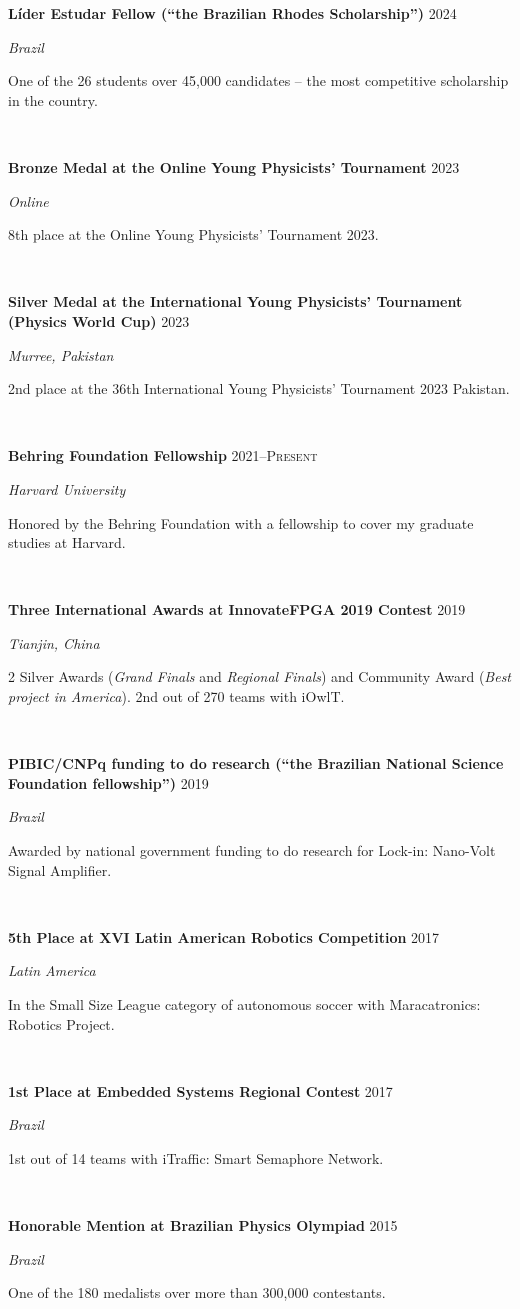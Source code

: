 \documentclass[letterpaper,10pt]{article}
\newcommand{\entry}[4]{

\begin{minipage}[t]{.15\textwidth}
\end{minipage}
\hfill\vline\hfill 
\begin{minipage}[t]{0.95\textwidth}
#2 \hfill \textsc{#1}

\textit{#3}

\footnotesize{#4}
\end{minipage}\\\vspace{.25cm}}
\begin{document}
\entry{2024}{\textbf{Líder Estudar Fellow (``the Brazilian Rhodes Scholarship'')} }{Brazil}{
	One of the 26 students over 45,000 candidates -- the most competitive scholarship in the country.	
}

\entry{2023}{\textbf{Bronze Medal at the Online Young Physicists' Tournament}}{Online}{
	8th place at the Online Young Physicists' Tournament 2023.	
}

\entry{2023}{\textbf{Silver Medal at the International Young Physicists' Tournament (Physics World Cup)}}{Murree, Pakistan}{
	2nd place at the 36th International Young Physicists' Tournament 2023 Pakistan.	
}

\entry{2021--Present}{\textbf{Behring Foundation Fellowship}}{Harvard University}{
	Honored by the Behring Foundation with a fellowship to cover my graduate studies at Harvard.	
}

\entry{2019}{\textbf{Three International Awards at InnovateFPGA 2019 Contest}}{Tianjin, China}{
	2 Silver Awards (\textit{Grand Finals} and \textit{Regional Finals}) and Community Award (\textit{Best project in America}). 2nd out of 270 teams with iOwlT.
}

\entry{2019}{\textbf{PIBIC/CNPq funding to do research (``the Brazilian National Science Foundation fellowship'')}}{Brazil}{
	Awarded by national government funding to do research for Lock-in: Nano-Volt Signal Amplifier.	
}

\entry{2017}{\textbf{5th Place at XVI Latin American Robotics Competition}}{Latin America}{
	In the Small Size League category of autonomous soccer with Maracatronics: Robotics Project.
}

\entry{2017}{\textbf{1st Place at Embedded Systems Regional Contest}}{Brazil}{
	1st out of 14 teams with iTraffic: Smart Semaphore Network.
}

\entry{2015}{\textbf{Honorable Mention at Brazilian Physics Olympiad}}{Brazil}{
	One of the 180 medalists over more than 300,000 contestants.
}
\vspace*{-.25cm}
\end{document}
